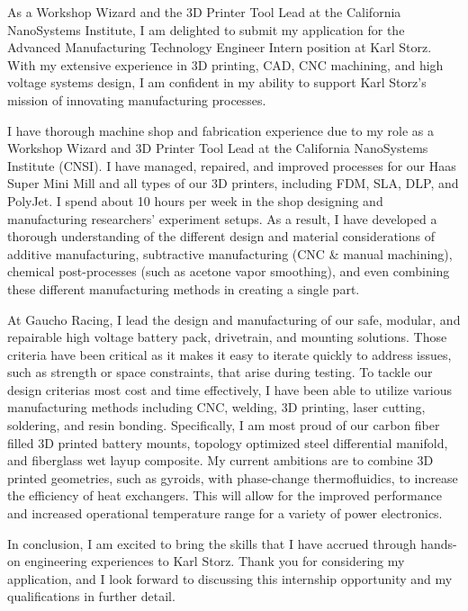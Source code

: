 \documentclass[11pt, letterpaper]{awesome-cv} %
\begin{document}
\makecvheader %

\makelettertitle %


\begin{cvletter}


As a Workshop Wizard and the 3D Printer Tool Lead at the California NanoSystems Institute, I am delighted to submit my application for the Advanced Manufacturing Technology Engineer Intern position at Karl Storz. With my extensive experience in 3D printing, CAD, CNC machining, and high voltage systems design, I am confident in my ability to support Karl Storz's mission of innovating manufacturing processes.

I have thorough machine shop and fabrication experience due to my role as a Workshop Wizard and 3D Printer Tool Lead at the California NanoSystems Institute (CNSI). I have managed, repaired, and improved processes for our Haas Super Mini Mill and all types of our 3D printers, including FDM, SLA, DLP, and PolyJet. I spend about 10 hours per week in the shop designing and manufacturing researchers' experiment setups. As a result, I have developed a thorough understanding of the different design and material considerations of additive manufacturing, subtractive manufacturing (CNC \& manual machining), chemical post-processes (such as acetone vapor smoothing), and even combining these different manufacturing methods in creating a single part.

At Gaucho Racing, I lead the design and manufacturing of our safe, modular, and repairable high voltage battery pack, drivetrain, and mounting solutions. Those criteria have been critical as it makes it easy to iterate quickly to address issues, such as strength or space constraints, that arise during testing. To tackle our design criterias most cost and time effectively, I have been able to utilize various manufacturing methods including CNC, welding, 3D printing, laser cutting, soldering, and resin bonding. Specifically, I am most proud of our carbon fiber filled 3D printed battery mounts, topology optimized steel differential manifold, and fiberglass wet layup composite. My current ambitions are to combine 3D printed geometries, such as gyroids, with phase-change thermofluidics, to increase the efficiency of heat exchangers. This will allow for the improved performance and increased operational temperature range for a variety of power electronics.

In conclusion, I am excited to bring the skills that I have accrued through hands-on engineering experiences to Karl Storz. Thank you for considering my application, and I look forward to discussing this internship opportunity and my qualifications in further detail.


\end{cvletter}


\makeletterclosing %
\end{document}
